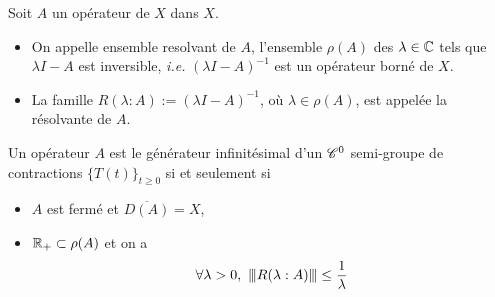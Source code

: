 \begin{definition}
    Soit $A$ un opérateur de $X$ dans $X$. 
    \begin{itemize}
        \item On appelle \textcolor{astral}{ensemble resolvant de $A$}, l'ensemble $\rho(A)$ des $\lambda \in \mathbb{C}$ tels que $\lambda I-A$ est inversible, \textit{i.e.} $(\lambda I-A)^{-1}$ est un opérateur borné de $X$.
        \item La famille $R(\lambda : A):=(\lambda I-A)^{-1}$, où $\lambda \in \rho(A)$, est appelée la \textcolor{astral}{résolvante de $A$}.
    \end{itemize}
\end{definition}

\begin{theorem}\label{thm_HY}
    Un opérateur $A$ est le générateur infinitésimal d'un $\mathscr{C}^0$ semi-groupe de contractions $\big\{T(t)\big\}_{t \geq 0}$ si et seulement si 
    \begin{itemize}
        \item[$(i)$] $A$ est fermé et $\overline{D(A)}=X$,
        \item[$(ii)$] $\mathbb{R}_+ \subset \rho(A)$ et on a 
        \begin{equation*}
            \forall \lambda >0, \ {\left\vert\kern-0.25ex\left\vert \kern-0.25ex\left\vert R(\lambda : A) \right\vert\kern-0.25ex\right\vert\kern-0.25ex\right\vert} \leq \frac{1}{\lambda}
        \end{equation*} 
    \end{itemize}
\end{theorem}

